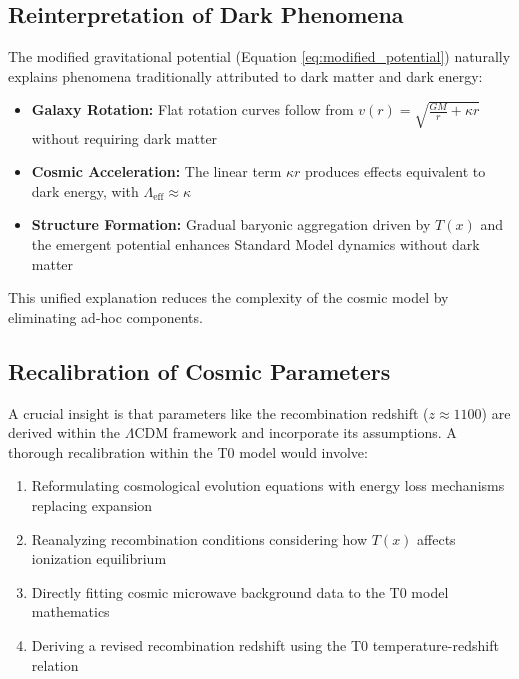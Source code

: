 \documentclass[aps,prl,twocolumn,superscriptaddress,nofootinbib]{revtex4-2}
\newcommand{\Tfield}{T(x)}
\newcommand{\LCDM}{\Lambda\text{CDM}}
\begin{document}
	\subsection{Reinterpretation of Dark Phenomena}
	\label{subsec:dark_reinterpretation}
	
	The modified gravitational potential (Equation \ref{eq:modified_potential}) naturally explains phenomena traditionally attributed to dark matter and dark energy:
	
	\begin{itemize}
		\item \textbf{Galaxy Rotation:} Flat rotation curves follow from $v(r) = \sqrt{\frac{GM}{r} + \kappa r}$ without requiring dark matter
		\item \textbf{Cosmic Acceleration:} The linear term $\kappa r$ produces effects equivalent to dark energy, with $\Lambda_{\text{eff}} \approx \kappa$
		\item \textbf{Structure Formation:} Gradual baryonic aggregation driven by $\Tfield$ and the emergent potential enhances Standard Model dynamics without dark matter
	\end{itemize}
	
	This unified explanation reduces the complexity of the cosmic model by eliminating ad-hoc components.
	
	\subsection{Recalibration of Cosmic Parameters}
	\label{subsec:recalibration}
	
	A crucial insight is that parameters like the recombination redshift ($z \approx 1100$) are derived within the $\LCDM$ framework and incorporate its assumptions. A thorough recalibration within the T0 model would involve:
	
	\begin{enumerate}
		\item Reformulating cosmological evolution equations with energy loss mechanisms replacing expansion
		\item Reanalyzing recombination conditions considering how $\Tfield$ affects ionization equilibrium
		\item Directly fitting cosmic microwave background data to the T0 model mathematics
		\item Deriving a revised recombination redshift using the T0 temperature-redshift relation
	\end{enumerate}
	
\end{document}
